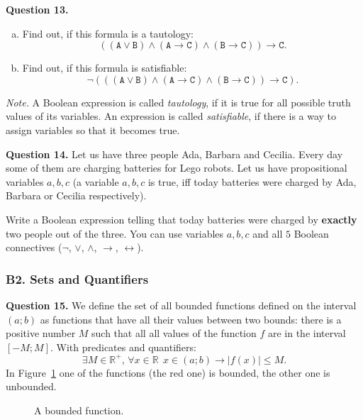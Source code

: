 \documentclass[jou]{apa6}
\begin{document}
\vspace{6pt}
{\bf Question 13.} 
\begin{enumerate}[(a)]
\item Find out, if this formula is a tautology: 
$$\mathtt{((A \vee B) \wedge (A \rightarrow C) \wedge 
(B \rightarrow C)) \rightarrow C}.$$
\item Find out, if this formula is satisfiable: 
$$\mathtt{\neg (((A \vee B) \wedge (A \rightarrow C) \wedge 
(B \rightarrow C)) \rightarrow C)}.$$
\end{enumerate}

{\em Note.} A Boolean expression is called {\em tautology}, 
if it is true for all 
possible truth values of its variables. 
An expression is called {\em satisfiable}, 
if there is a way to assign 
variables so that it becomes true. 

\vspace{6pt}
{\bf Question 14.} 
Let us have three people \textendash{} Ada, Barbara and Cecilia. 
Every day some of them are charging batteries for Lego robots.
Let us have propositional variables $a,b,c$ (a variable $a,b,c$ is true, iff 
today batteries were charged by Ada, Barbara or Cecilia respectively). 

Write a Boolean expression telling that today batteries were charged
by {\bf exactly} two people out of the three. You can use variables $a,b,c$ and
all $5$ Boolean connectives ($\neg$, $\vee$, $\wedge$, $\rightarrow$, 
$\leftrightarrow$). 



\subsubsection{B2. Sets and Quantifiers}

{\bf Question 15.} We define the set of all bounded functions defined on the interval $(a;b)$ 
as functions that have all their values between two bounds: there is a positive number $M$
such that all all values of the function $f$ are in the interval $[-M;M]$. With predicates and quantifiers:
$$\exists M \in \mathbb{R}^{+},\,\forall x \in \mathbb{R}\,\;x \in (a;b) \rightarrow |f(x)| \leq M.$$
In Figure~\ref{fig:bounded-function} one of the functions (the red one) is bounded, the other one is unbounded.
\begin{figure}[!htb]
\caption{\label{fig:bounded-function} A bounded function.}
\end{figure}
\end{document}
